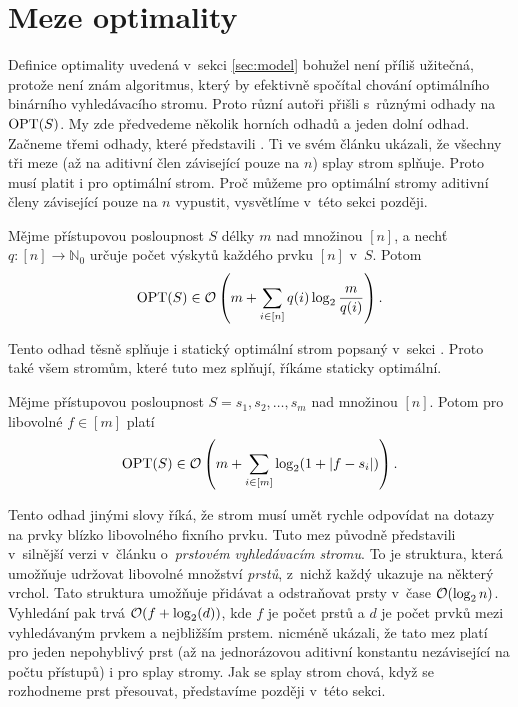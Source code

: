 \section{Meze optimality}

Definice optimality uvedená v~sekci \ref{sec:model} bohužel není příliš užitečná, protože není
znám algoritmus, který by efektivně spočítal chování optimálního binárního
vyhledávacího stromu. Proto různí autoři přišli s~různými odhady na $\operatorname{OPT}(S)$.
My zde předvedeme několik horních odhadů a jeden dolní odhad. Začneme třemi
odhady, které představili \citet{splay}. Ti ve svém článku ukázali, že
všechny tři meze (až na aditivní člen závisející pouze na $n$) splay strom
splňuje. Proto musí platit i pro optimální strom. Proč můžeme pro optimální
stromy aditivní členy závisející pouze na $n$ vypustit, vysvětlíme v~této sekci později.

\begin{veta}
Mějme přístupovou posloupnost $S$ délky $m$ nad množinou $[n]$, a nechť $q:[n]\rightarrow \mathbb N_0$ určuje počet výskytů každého prvku $[n]$ v~$S$. Potom $$\opt(S) \in \o\left(m + \sum_{i\in [n]}q(i)\log\frac m{q(i)}\right).$$
\end{veta}

Tento odhad těsně splňuje i statický optimální strom popsaný v~sekci . Proto také všem stromům, které tuto mez splňují, říkáme staticky optimální.  

\begin{veta}
Mějme přístupovou posloupnost $S = s_1, s_2,\dots, s_m$ nad množinou $[n]$. Potom pro libovolné $f\in [m]$ platí $$\opt(S) \in \o\left(m + \sum_{i\in [m]} \log(1 + |f-s_i|) \right).$$
\end{veta}

Tento odhad jinými slovy říká, že strom musí umět rychle odpovídat na dotazy na
prvky blízko libovolného fixního prvku. Tuto mez původně představili v~silnější
verzi \citet{fingersearchtree} v~článku o~\emph{prstovém vyhledávacím stromu}. To je
struktura, která umožňuje udržovat libovolné množství \emph{prstů}, z~nichž každý
ukazuje na některý vrchol. Tato struktura umožňuje přidávat a odstraňovat prsty
v~čase $\o(\log n)$. Vyhledání pak trvá $\o(f+\log(d))$, kde $f$ je počet prstů
a $d$ je počet prvků mezi vyhledávaným prvkem a nejbližším prstem.
\citet{splay}  nicméně ukázali, že tato mez platí pro jeden nepohyblivý
prst (až na jednorázovou aditivní konstantu nezávisející na počtu přístupů) i
pro splay stromy. Jak se splay strom chová, když se rozhodneme prst přesouvat,
představíme později v~této sekci. 


